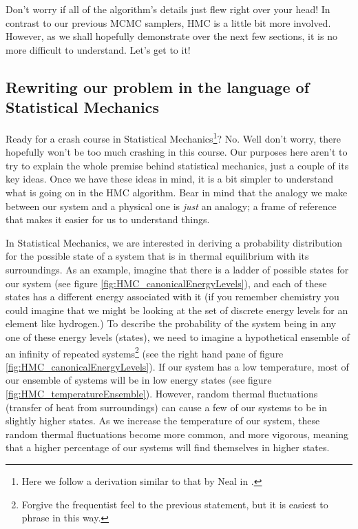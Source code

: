 \documentclass[11pt,fullpage]{book}
\begin{document}
Don't worry if all of the algorithm's details just flew right over your head! In contrast to our previous MCMC samplers, HMC is a little bit more involved. However, as we shall hopefully demonstrate over the next few sections, it is no more difficult to understand. Let's get to it!

\subsection{Rewriting our problem in the language of Statistical Mechanics}
Ready for a crash course in Statistical Mechanics\footnote{Here we follow a derivation similar to that by Neal in \cite{brooks2011handbook}.}? No. Well don't worry, there hopefully won't be too much crashing in this course. Our purposes here aren't to try to explain the whole premise behind statistical mechanics, just a couple of its key ideas. Once we have these ideas in mind, it is a bit simpler to understand what is going on in the HMC algorithm. Bear in mind that the analogy we make between our system and a physical one is \textit{just} an analogy; a frame of reference that makes it easier for us to understand things.

In Statistical Mechanics, we are interested in deriving a probability distribution for the possible state of a system that is in thermal equilibrium with its surroundings. As an example, imagine that there is a ladder of possible states for our system (see figure \ref{fig:HMC_canonicalEnergyLevels}), and each of these states has a different energy associated with it (if you remember chemistry you could imagine that we might be looking at the set of discrete energy levels for an element like hydrogen.) To describe the probability of the system being in any one of these energy levels (states), we need to imagine a hypothetical ensemble of an infinity of repeated systems\footnote{Forgive the frequentist feel to the previous statement, but it is easiest to phrase in this way.} (see the right hand pane of figure \ref{fig:HMC_canonicalEnergyLevels}).  If our system has a low temperature, most of our ensemble of systems will be in low energy states (see figure \ref{fig:HMC_temperatureEnsemble}). However, random thermal fluctuations (transfer of heat from surroundings) can cause a few of our systems to be in slightly higher states. As we increase the temperature of our system, these random thermal fluctuations become more common, and more vigorous, meaning that a higher percentage of our systems will find themselves in higher states. 
\end{document}
